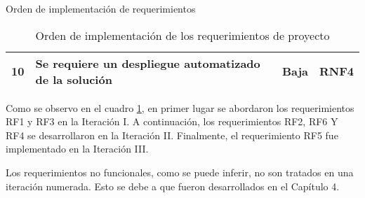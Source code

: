 \begin{section}{Orden de implementación de requerimientos}
\begin{table}[h]
\begin{tabular}{|m{3em}|m{26em}|m{4em}|m{4em}|}
    10    & Se requiere un despliegue automatizado de la solución                                                                         & Baja  & RNF4    \\ \hline
    \end{tabular}
    \caption{Orden de implementación de los requerimientos de proyecto}
    \label{table:13}
    \end{table}
    \FloatBarrier
    Como se observo en el cuadro \ref{table:13}, en primer lugar se abordaron los requerimientos RF1 y RF3 en la Iteración I. A continuación, los requerimientos RF2, RF6 Y RF4 se desarrollaron en la Iteración II. Finalmente, el requerimiento RF5 fue implementado en la Iteración III. \par
    Los requerimientos no funcionales, como se puede inferir, no son tratados en una iteración numerada. Esto se debe a que fueron desarrollados en el Capítulo 4.
    \end{section}
    